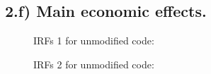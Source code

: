 \documentclass{article}
\begin{document}
\subsection*{2.f) Main economic effects.}



\begin{figure}
\caption{IRFs 1 for unmodified code:}
\end{figure}

\begin{figure}
\caption{IRFs 2 for unmodified code:}
\end{figure}






\end{document}
